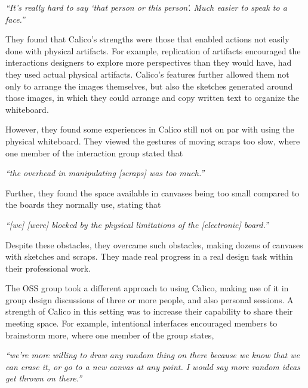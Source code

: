 \begin{myindentpar}{1cm}
\emph{``It's really hard to say `that person or this person'. Much easier to speak to a face.''}
\end{myindentpar}

 They found that Calico's strengths were those that enabled actions not easily done with physical artifacts. For example, replication of artifacts encouraged the interactions designers to explore more perspectives than they would have, had they used actual physical artifacts. Calico's features further allowed them not only to arrange the images themselves, but also the sketches generated around those images, in which they could arrange and copy written text to organize the whiteboard. 

However, they found some experiences in Calico still not on par with using the physical whiteboard. They viewed the gestures of moving scraps too slow, where one member of the interaction group stated that 

\begin{myindentpar}{1cm}
\emph{``the overhead in manipulating [scraps] was too much.''}
\end{myindentpar}

 Further, they found the space available in canvases being too small compared to the boards they normally use, stating that

\begin{myindentpar}{1cm}
\emph{``[we] [were] blocked by the physical limitations of the [electronic] board.''}
\end{myindentpar}
 
Despite these obstacles, they overcame such obstacles, making dozens of canvases with sketches and scraps. They made real progress in a real design task within their professional work.

The OSS group took a different approach to using Calico, making use of it in group design discussions of three or more people, and also personal sessions. A strength of Calico in this setting was to increase their capability to share their meeting space. For example, intentional interfaces encouraged members to brainstorm more, where one member of the group states, 

\begin{myindentpar}{1cm}
\emph{``we're more willing to draw any random thing on there because we know that we can erase it, or go to a new canvas at any point. I would say more random ideas get thrown on there.''}
\end{myindentpar}

